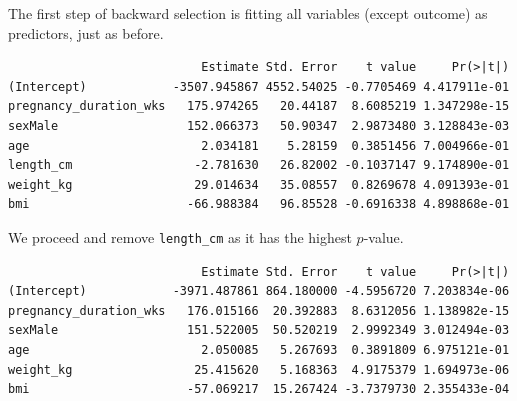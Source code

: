 \documentclass[
  letterpaper,
  DIV=11,
  numbers=noendperiod]{scrreprt}
\newenvironment{Shaded}{\begin{snugshade}}{\end{snugshade}}
\newcommand{\AttributeTok}[1]{\textcolor[rgb]{0.40,0.45,0.13}{#1}}
\newcommand{\CommentTok}[1]{\textcolor[rgb]{0.37,0.37,0.37}{#1}}
\newcommand{\FunctionTok}[1]{\textcolor[rgb]{0.28,0.35,0.67}{#1}}
\newcommand{\NormalTok}[1]{\textcolor[rgb]{0.00,0.23,0.31}{#1}}
\newcommand{\OtherTok}[1]{\textcolor[rgb]{0.00,0.23,0.31}{#1}}
\newcommand{\SpecialCharTok}[1]{\textcolor[rgb]{0.37,0.37,0.37}{#1}}
\begin{document}
The first step of backward selection is fitting all variables (except
outcome) as predictors, just as before.

\begin{Shaded}
\end{Shaded}

\begin{verbatim}
                           Estimate Std. Error    t value     Pr(>|t|)
(Intercept)            -3507.945867 4552.54025 -0.7705469 4.417911e-01
pregnancy_duration_wks   175.974265   20.44187  8.6085219 1.347298e-15
sexMale                  152.066373   50.90347  2.9873480 3.128843e-03
age                        2.034181    5.28159  0.3851456 7.004966e-01
length_cm                 -2.781630   26.82002 -0.1037147 9.174890e-01
weight_kg                 29.014634   35.08557  0.8269678 4.091393e-01
bmi                      -66.988384   96.85528 -0.6916338 4.898868e-01
\end{verbatim}

We proceed and remove \texttt{length\_cm} as it has the highest
\(p\)-value.

\begin{Shaded}
\end{Shaded}

\begin{verbatim}
                           Estimate Std. Error    t value     Pr(>|t|)
(Intercept)            -3971.487861 864.180000 -4.5956720 7.203834e-06
pregnancy_duration_wks   176.015166  20.392883  8.6312056 1.138982e-15
sexMale                  151.522005  50.520219  2.9992349 3.012494e-03
age                        2.050085   5.267693  0.3891809 6.975121e-01
weight_kg                 25.415620   5.168363  4.9175379 1.694973e-06
bmi                      -57.069217  15.267424 -3.7379730 2.355433e-04
\end{verbatim}
\end{document}
